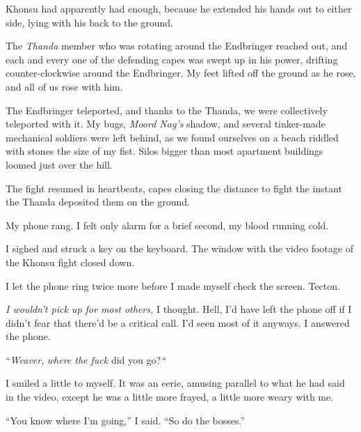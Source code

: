 Khonsu had apparently had enough, because he extended his hands out to either side, lying with his back to the ground.



The \emph{Thanda} member who was rotating around the Endbringer reached out, and each and every one of the defending capes was swept up in his power, drifting counter-clockwise around the Endbringer.  My feet lifted off the ground as he rose, and all of us rose with him.



The Endbringer teleported, and thanks to the Thanda, we were collectively teleported with it.  My bugs, \emph{Moord Nag's }shadow, and several tinker-made mechanical soldiers were left behind, as we found ourselves on a beach riddled with stones the size of my fist.  Silos bigger than most apartment buildings loomed just over the hill.



The fight resumed in heartbeats, capes closing the distance to fight the instant the Thanda deposited them on the ground.



\sectionbreak



My phone rang. I felt only alarm for a brief second, my blood running cold.



I sighed and struck a key on the keyboard.  The window with the video footage of the Khonsu fight closed down.



I let the phone ring twice more before I made myself check the screen.  Tecton.



\emph{I wouldn't pick up for most others, }I thought.  Hell, I'd have left the phone off if I didn't fear that there'd be a critical call.  I'd seen most of it anyways.  I answered the phone.



``\emph{Weaver}, \emph{where the fuck} did you go?\emph{``}



I smiled a little to myself.  It was an eerie, amusing parallel to what he had said in the video, except he was a little more frayed, a little more weary with me.



``You know where I'm going,'' I said.  ``So do the bosses.''



